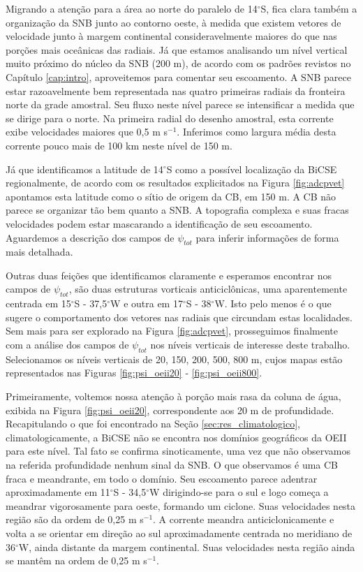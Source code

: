 Migrando a atenção para a área ao norte do paralelo de 14$^\circ$S, fica
clara também a organização da SNB junto ao contorno oeste, à medida que existem vetores de velocidade junto à margem continental
consideravelmente maiores do que nas porções mais oceânicas das radiais. 
Já que estamos analisando um nível vertical muito próximo do núcleo da
SNB (200 m), de acordo com os padrões revistos no Capítulo \ref{cap:intro}, aproveitemos para comentar seu escoamento. A SNB parece
estar razoavelmente bem representada nas quatro primeiras radiais da fronteira norte da grade amostral. Seu fluxo neste nível parece se intensificar 
a medida que se dirige para o norte. Na primeira radial do desenho amostral, esta corrente exibe velocidades maiores que 
0,5 m s$^{-1}$. Inferimos como largura média desta corrente pouco mais de 100 km neste nível de 150 m.

Já que identificamos a latitude de 14$^\circ$S como a possível localização da BiCSE regionalmente,
 de acordo com os resultados explicitados 
na Figura \ref{fig:adcpvet} apontamos esta latitude como o sítio de origem da CB, em 150 m. A CB não parece se 
organizar tão bem quanto a SNB. A topografia complexa e suas fracas velocidades podem estar mascarando a 
identificação de seu escoamento. Aguardemos a descrição dos campos de $\psi_{tot}$ para inferir 
informações de forma mais detalhada. 

Outras duas feições que identificamos claramente e esperamos encontrar nos campos de $\psi_{tot}$, são duas estruturas vorticais
anticiclônicas, uma aparentemente centrada em  15$^\circ$S - 37,5$^\circ$W e outra em 17$^\circ$S - 38$^\circ$W. Isto pelo menos
é o que sugere o comportamento dos vetores nas radiais que circundam estas localidades. Sem mais para ser explorado na 
Figura \ref{fig:adcpvet}, prosseguimos finalmente com a análise dos campos de $\psi_{tot}$ nos níveis 
verticais de interesse deste trabalho. Selecionamos os níveis verticais de 20, 150, 200, 500, 800 m, 
cujos mapas estão representados nas Figuras \ref{fig:psi_oeii20} - \ref{fig:psi_oeii800}.
 

Primeiramente, voltemos nossa atenção à porção mais rasa da coluna de água, exibida na Figura \ref{fig:psi_oeii20}, 
correspondente aos 20 m de profundidade. Recapitulando o que foi encontrado na Seção \ref{sec:res_climatologico}, climatologicamente, 
a BiCSE não se encontra nos domínios geográficos da OEII para este nível.
Tal fato se confirma sinoticamente, uma vez que não observamos na referida profundidade
nenhum sinal da SNB. O que observamos é uma CB fraca e meandrante, em todo o domínio.
Seu escoamento parece adentrar aproximadamente em 11$^\circ$S - 34,5$^\circ$W dirigindo-se para o sul e logo começa a 
meandrar vigorosamente para oeste, formando um ciclone.
Suas velocidades nesta região são da ordem de 0,25 m s$^{-1}$. 
A corrente meandra anticiclonicamente e volta a se orientar em direção ao sul aproximadamente centrada
 no meridiano de 36$^\circ$W, ainda distante da margem continental. Suas velocidades nesta região 
ainda se mantêm na ordem de 0,25 m s$^{-1}$.

